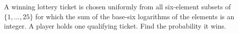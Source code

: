 A winning lottery ticket is chosen uniformly from all six-element subsets of $\{1,\ldots,25\}$ for which the sum of the base-six logarithms of the elements is an integer. A player holds one qualifying ticket. Find the probability it wins.
